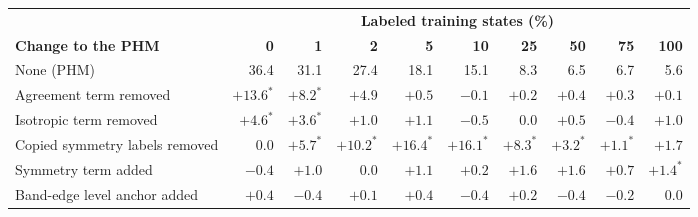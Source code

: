 \begin{tabular}{lrrrrrrrrr}
\toprule
 & \multicolumn{9}{c}{\textbf{Labeled training states (\%)}} \\
\cmidrule(l){2-10}
\textbf{Change to the PHM} & \textbf{0} & \textbf{1} & \textbf{2} & \textbf{5} & \textbf{10} & \textbf{25} & \textbf{50} & \textbf{75} & \textbf{100} \\
\midrule
None (PHM) & 36.4 & 31.1 & 27.4 & 18.1 & 15.1 & 8.3 & 6.5 & 6.7 & 5.6 \\
\addlinespace
Agreement term removed & $+13.6^{*}$ & $+8.2^{*}$ & $+4.9$ & $+0.5$ & $-0.1$ & $+0.2$ & $+0.4$ & $+0.3$ & $+0.1$ \\
Isotropic term removed & $+4.6^{*}$ & $+3.6^{*}$ & $+1.0$ & $+1.1$ & $-0.5$ & $0.0$ & $+0.5$ & $-0.4$ & $+1.0$ \\
Copied symmetry labels removed & $0.0$ & $+5.7^{*}$ & $+10.2^{*}$ & $+16.4^{*}$ & $+16.1^{*}$ & $+8.3^{*}$ & $+3.2^{*}$ & $+1.1^{*}$ & $+1.7$ \\
\addlinespace
Symmetry term added & $-0.4$ & $+1.0$ & $0.0$ & $+1.1$ & $+0.2$ & $+1.6$ & $+1.6$ & $+0.7$ & $+1.4^{*}$ \\
Band-edge level anchor added & $+0.4$ & $-0.4$ & $+0.1$ & $+0.4$ & $-0.4$ & $+0.2$ & $-0.4$ & $-0.2$ & $0.0$ \\
\bottomrule
\end{tabular}
